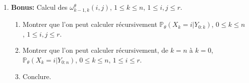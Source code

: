 \documentclass[a4paper,10pt,fleqn]{article}
\newcommand{\eqsp}{\,}
\newcommand{\1}{\ensuremath{\mathbbm{1}}}
\begin{document}
\begin{enumerate}
\item {\bf Bonus:} Calcul des $\omega_{k-1,k}^{\theta}(i,j)$, $1\leq k \leq n$, $1\leq i, j \leq r$.
\begin{enumerate}
\item Montrer que l'on peut calculer r\'ecursivement $ \mathbb{P}_{\theta}\left(X_k=i|Y_{0:k}\right)$, $0\leq k \leq n$, $1\leq i, j \leq r$.
\item Montrer que l'on peut calculer r\'ecursivement, de $k=n$ \`a $k = 0$, $ \mathbb{P}_{\theta}\left(X_k=i|Y_{0:n}\right)$, $0\leq k \leq n$, $1\leq i\leq r$.
\item Conclure.
\end{enumerate}
\end{enumerate}


\end{document}
